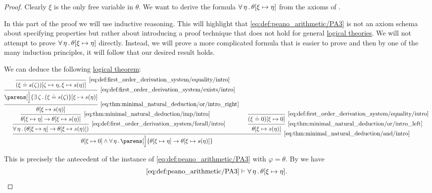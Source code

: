 \begin{proof}
  Clearly \( \xi \) is the only free variable in \( \theta \). We want to derive the formula \( \forall \thinspace \eta \thinspace . \thinspace \theta[\xi \mapsto \eta] \) from the axioms of .

  In this part of the proof we will use inductive reasoning. This will highlight that \eqref{eq:def:peano_arithmetic/PA3} is not an axiom schema about specifying properties but rather about introducing a proof technique that does not hold for general \hyperref[def:first_order_theory]{logical theories}. We will not attempt to prove \( \forall \thinspace \eta \thinspace . \thinspace \theta[\xi \mapsto \eta] \) directly. Instead, we will prove a more complicated formula that is easier to prove and then by one of the many induction principles, it will follow that our desired result holds.

  We can deduce the following \hyperref[def:derivation_system_derivability]{logical theorem}:
  \begin{equation*}
    \begin{prooftree}
      \infer0[\eqref{eq:def:first_order_derivation_system/equality/intro}]{ (\xi \doteq s(\zeta))[\zeta \mapsto \eta, \xi \mapsto s(\eta)] }
      \infer1[\eqref{eq:def:first_order_derivation_system/exists/intro}]{ \parens[\Big]{ \qexists \zeta (\xi \doteq s(\zeta) }[\xi \mapsto s(\eta)] }
      \infer1[\eqref{eq:thm:minimal_natural_deduction/or/intro_right}]{ \theta[\xi \mapsto s(\eta)] }
      \infer1[\eqref{eq:thm:minimal_natural_deduction/imp/intro}]{ \theta[\xi \mapsto \eta] \rightarrow \theta[\xi \mapsto s(\eta)] }
      \infer1[\eqref{eq:def:first_order_derivation_system/forall/intro}]{ \qforall \eta (\theta[\xi \mapsto \eta] \rightarrow \theta[\xi \mapsto s(\eta)]) }

      \infer0[\eqref{eq:def:first_order_derivation_system/equality/intro}]{ (\xi \doteq 0)[\xi \mapsto 0] }
      \infer1[\eqref{eq:thm:minimal_natural_deduction/or/intro_left}]{ \theta[\xi \mapsto s(\eta)] }

      \infer2[\eqref{eq:thm:minimal_natural_deduction/and/intro}]{ \theta[\xi \mapsto 0] \wedge \qforall \eta \parens[\Big] { \theta[\xi \mapsto \eta] \rightarrow \theta[\xi \mapsto s(\eta)] } }
    \end{prooftree}
  \end{equation*}

  This is precisely the antecedent of the instance of \eqref{eq:def:peano_arithmetic/PA3} with \( \varphi = \theta \). By  we have
  \begin{equation*}
    \eqref{eq:def:peano_arithmetic/PA3} \vdash \forall \thinspace \eta \thinspace . \thinspace \theta[\xi \mapsto \eta].
  \end{equation*}


\end{proof}
